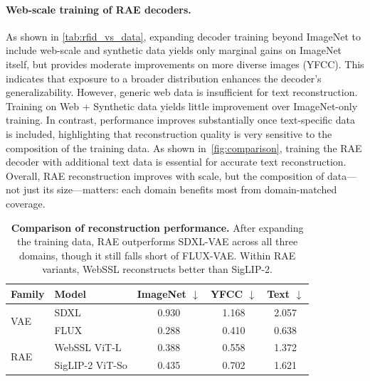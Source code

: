 \documentclass[10pt,twocolumn,letterpaper]{article}
\begin{document}
\paragraph{Web-scale training of RAE decoders.}
As shown in \cref{tab:rfid_vs_data}, expanding decoder training beyond ImageNet to include web-scale and synthetic data yields only marginal gains on ImageNet itself, but provides moderate improvements on more diverse images (YFCC). This indicates that exposure to a broader distribution enhances the decoder’s generalizability. However, generic web data is insufficient for text reconstruction. Training on Web + Synthetic data yields little improvement over ImageNet-only training. In contrast, performance improves substantially once text-specific data is included, highlighting that reconstruction quality is very sensitive to the composition of the training data. As shown in~\cref{fig:comparison}, training the RAE decoder with additional text data is essential for accurate text reconstruction.
Overall, RAE reconstruction improves with scale, but the composition of data---not just its size---matters: each domain benefits most from domain-matched coverage.

\begin{table}[t]
    \centering
    \small
    \setlength{\tabcolsep}{5.2pt}  %
    \caption{
        \textbf{Comparison of reconstruction performance.}
        After expanding the training data, RAE outperforms SDXL-VAE across all three domains, though it still falls short of FLUX-VAE. Within RAE variants, WebSSL reconstructs better than SigLIP-2.
    }\label{tab:rfid_vs_vae}
    \begin{tabular}{l l ccc}
        \toprule
        \textbf{Family} & \textbf{Model} & \textbf{ImageNet} $\downarrow$ & \textbf{YFCC} $\downarrow$ & \textbf{Text} $\downarrow$ \\
        \midrule
        \multirow{2}{*}{VAE}
            & SDXL & 0.930 & 1.168 & 2.057 \\
            & FLUX & 0.288 & 0.410 & 0.638 \\
        \midrule
        \multirow{2}{*}{RAE}
            & WebSSL ViT-L & 0.388 & 0.558 & 1.372 \\
            & \cellcolor{green!10}SigLIP-2 ViT-So 
                & \cellcolor{green!10}0.435 
                & \cellcolor{green!10}0.702 
                & \cellcolor{green!10}1.621 \\
        \bottomrule
    \end{tabular}
\end{table}
\end{document}
